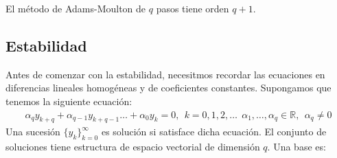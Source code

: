 \begin{prop}
    El método de Adams-Moulton de $q$ pasos tiene orden $q+1$.
\end{prop}

\subsection{Estabilidad}
Antes de comenzar con la estabilidad, necesitmos recordar las ecuaciones en diferencias lineales homogéneas y de coeficientes constantes. Supongamos que tenemos la siguiente ecuación:
\begin{align*}
    \alpha_q y_{k+q} + \alpha_{q-1} y_{k+q-1} \ldots + \alpha_0 y_k = 0, \ \ k = 0,1,2,\ldots \ \ \alpha_1,\ldots,\alpha_q \in \mathbb{R}, \ \ \alpha_q \not = 0
\end{align*}
Una sucesión $\{y_k\}_{k=0}^{\infty}$ es solución si satisface dicha ecuación. El conjunto de soluciones tiene estructura de espacio vectorial de dimensión $q$. Una base es:

